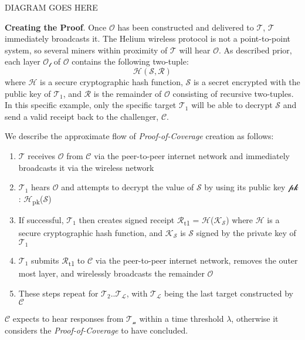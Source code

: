 \documentclass[letterpaper,11pt]{article}
\def\proofofcoverage/{\textit{Proof-of-Coverage}}
\begin{document}
DIAGRAM GOES HERE\newline

\textbf{Creating the Proof}. Once $\mathcal{O}$ has been constructed and delivered to $\mathcal{T}$, $\mathcal{T}$ immediately broadcasts it. The Helium wireless protocol is not a point-to-point system, so several miners within proximity of $\mathcal{T}$ will hear $\mathcal{O}$. As described prior, each layer $\mathcal{O_l}$ of $\mathcal{O}$ contains the following two-tuple: $$\mathcal{H}(\mathcal{S}, \mathcal{R})$$ where $\mathcal{H}$ is a secure cryptographic hash function, $\mathcal{S}$ is a secret encrypted with the public key of $\mathcal{T_1}$, and $\mathcal{R}$ is the remainder of $\mathcal{O}$ consisting of recursive two-tuples. In this specific example, only the specific target $\mathcal{T_1}$ will be able to decrypt $\mathcal{S}$ and send a valid receipt back to the challenger, $\mathcal{C}$.\newline

We describe the approximate flow of \proofofcoverage/ creation as follows:

\begin{enumerate}
  \item $\mathcal{T}$ receives $\mathcal{O}$ from $\mathcal{C}$ via the peer-to-peer internet network and immediately broadcasts it via the wireless network
  \item $\mathcal{T_1}$ hears $\mathcal{O}$ and attempts to decrypt the value of $\mathcal{S}$ by using its public key $\mathcal{pk}$: $\mathcal{H}$\textsubscript{pk}($\mathcal{S}$)
  \item If successful, $\mathcal{T_1}$ then creates signed receipt $\mathcal{R}$\textsubscript{t1} = $\mathcal{H}$($\mathcal{K_S}$) where $\mathcal{H}$ is a secure cryptographic hash function, and $\mathcal{K_S}$ is $\mathcal{S}$ signed by the private key of $\mathcal{T_1}$
  \item $\mathcal{T_1}$ submits $\mathcal{R}$\textsubscript{t1} to $\mathcal{C}$ via the peer-to-peer internet network, removes the outer most layer, and wirelessly broadcasts the remainder $\mathcal{O}$
  \item These steps repeat for $\mathcal{T_2}$..$\mathcal{T_L}$, with $\mathcal{T_L}$ being the last target constructed by $\mathcal{C}$
\end{enumerate}

$\mathcal{C}$ expects to hear responses from $\mathcal{T_n}$ within a time threshold $\mathcal{\lambda}$, otherwise it considers the \proofofcoverage/ to have concluded.\newline
\end{document}
